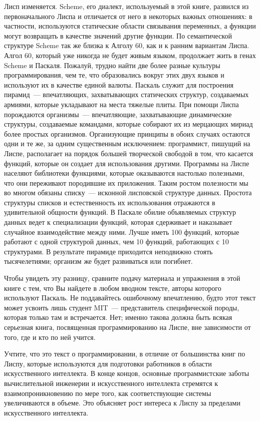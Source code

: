 Лисп изменяется. Scheme, его диалект, используемый в этой
книге, развился из первоначального Лиспа и отличается от него в
некоторых важных отношениях: в частности, используются статические области связывания
переменных, а функции могут возвращать в качестве значений другие 
функции. По семантической структуре Scheme так же близка к Алголу 60,
как и к ранним вариантам Лиспа.  Алгол 60, который уже никогда не будет живым
языком, продолжает жить в генах Scheme и Паскаля.  Пожалуй, трудно
найти две более разные культуры программирования, чем те, что
образовались вокруг этих двух языков и используют их в качестве
единой валюты.  Паскаль служит для построения 
пирамид~--- впечатляющих, захватывающих статических структур,
создаваемых армиями, которые укладывают на места тяжелые плиты.  При
помощи Лиспа порождаются организмы~--- впечатляющие, захватывающие
динамические структуры, создаваемые командами, которые собирают их из
мерцающих мириад более простых организмов.  Организующие принципы в
обоих случаях остаются одни и те же, за одним существенным исключением:
программист, пишущий на Лиспе, располагает на порядок большей творческой свободой
в том, что касается функций, которые он создает для использования
другими. Программы на Лиспе населяют библиотеки функциями, которые
оказываются настолько полезными, что они переживают породившие их приложения.  Таким
ростом полезности мы во многом обязаны списку~--- исконной лисповской
структуре данных.  Простота структуры списков и естественность их
использования отражаются в удивительной общности функций.  В Паскале обилие объявляемых структур 
данных ведет к специализации функций, которая сдерживает и наказывает
случайное взаимодействие между ними.  Лучше иметь 100 функций, которые работают с одной
структурой данных, чем 10 функций, работающих с 10
структурами. В результате пирамиде приходится неподвижно стоять
тысячелетиями; организм же будет развиваться или погибнет.

	Чтобы увидеть эту разницу, сравните подачу
материала и упражнения в этой книге с тем, что Вы найдете в любом
вводном тексте, авторы которого используют Паскаль. Не поддавайтесь
ошибочному впечатлению, будто этот текст может усвоить лишь студент MIT~--- представитель
специфической породы, которая только там и встречается.   Нет; именно
такова должна быть всякая серьезная книга, посвященная
программированию на Лиспе, вне зависимости от того, где и кто по ней
учится.

	Учтите, что это текст о программировании, в отличие от
большинства книг по Лиспу, которые используются для подготовки
работников в области искусственного интеллекта.  В конце концов, основные
программистские заботы вычислительной инженерии и искусственного
интеллекта стремятся к взаимопроникновению по мере того, как соответствующие
системы увеличиваются в объеме.  Это объясняет рост интереса к
Лиспу за пределами искусственного интеллекта.

